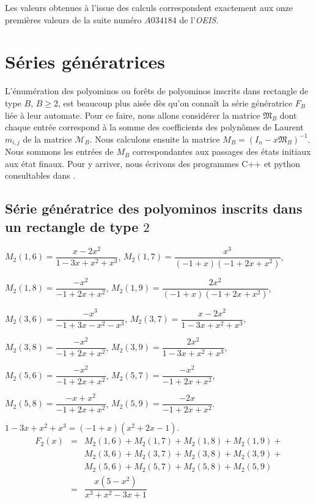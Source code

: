 Les valeurs obtenues à l'issue des calculs correspondent exactement aux onze premières valeurs de la suite numéro $A034184$  de l'\emph{OEIS}.

\section{Séries génératrices}
L'énumération des polyominos ou forêts de polyominos inscrits dans rectangle de type $B$, $B\geq 2$, est beaucoup plus aisée dès qu'on connaît la série génératrice $F_{B}$ liée à leur automate.  Pour ce faire, nous allons considérer la matrice $\mathfrak{M}_{B}$ dont chaque entrée correspond à la somme des coefficients des polynômes de Laurent $m_{i,j}$ de la matrice $\mathcal{M}_{B}$. Nous calculons ensuite la matrice $\mathit{M}_{B}=(I_{n}-x\mathfrak{M}_{B})^{-1}$. Nous sommons les entrées de $\mathit{M}_{B}$ correspondantes aux passages des états initiaux aux état finaux. Pour y arriver, nous écrivons des programmes C++ et python consultables dans \cite{Code}.

\subsection{Série génératrice des polyominos inscrits dans un rectangle de type $2$}


$\mathit{M}_{2}(1,6)= \dfrac{x-2x^{2}}{1-3x+x^{2}+x^{3}}$,
$\mathit{M}_{2}(1,7)= \dfrac{x^3}{(-1+x)(-1+2x+x^2)}$,

$\mathit{M}_{2}(1,8)= \dfrac{-x^2}{-1+2x+x^2}$,
$\mathit{M}_{2}(1,9)= \dfrac{2x^2}{(-1+x)(-1+2x+x^2)}$,

$\mathit{M}_{2}(3,6)=\dfrac{-x^{3}}{-1+3x-x^{2}-x^{3}}$,
$\mathit{M}_{2}(3,7)= \dfrac{x-2x^{2}}{1-3x+x^{2}+x^{3}}$,

$\mathit{M}_{2}(3,8)= \dfrac{-x^2}{-1+2x+x^2}$,
$\mathit{M}_{2}(3,9)= \dfrac{2x^{2}}{1-3x+x^{2}+x^{3}}$,

$\mathit{M}_{2}(5,6)=\dfrac{-x^2}{-1+2x+x^2}$,
$\mathit{M}_{2}(5,7)=\dfrac{-x^2}{-1+2x+x^2}$,

$\mathit{M}_{2}(5,8)=\dfrac{-x+x^2}{-1+2x+x^2}$,
$\mathit{M}_{2}(5,9)=\dfrac{-2x}{-1+2x+x^2}$.

$1-3x+x^{2}+x^{3}= (-1+x)(x^{2}+2x-1)$.
\begin{eqnarray*}
F_{2}(x) & = & \mathit{M}_{2}(1,6)+\mathit{M}_{2}(1,7) + \mathit{M}_{2}(1,8)+\mathit{M}_{2}(1,9) +\\
& & \mathit{M}_{2}(3,6)+\mathit{M}_{2}(3,7)+\mathit{M}_{2}(3,8)+\mathit{M}_{2}(3,9)+\\
& & \mathit{M}_{2}(5,6) +\mathit{M}_{2}(5,7)+ \mathit{M}_{2}(5,8)+\mathit{M}_{2}(5,9)\\
&=& \dfrac{x(5 - x^{2})}{x^{3} + x^{2} - 3x + 1}
\end{eqnarray*}

